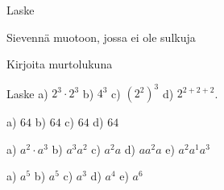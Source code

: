 \begin{tehtavasivu}
\begin{tehtava}
  		Laske
        \begin{vastaus}
        \end{vastaus}
\end{tehtava}

        \begin{tehtava}
    Sievennä muotoon, jossa ei ole sulkuja
        \begin{vastaus}
        \end{vastaus}
    \end{tehtava}

        \begin{tehtava}
  		Kirjoita murtolukuna
       \begin{vastaus}
        \end{vastaus}
    \end{tehtava}

   \begin{tehtava}
        Laske
        a) $2^3\cdot2^3$
        b) $4^3$
        c) $(2^2)^3$
        d) $2^{2+2+2}$.

        \begin{vastaus}
            a) $64$
            b) $64$
            c) $64$
            d) $64$
        \end{vastaus}
    \end{tehtava}
    
    \begin{tehtava}
        a) $a^2\cdot a^3$
        b) $a^3a^2$
        c) $a^2 a$
        d) $a a^2 a$
        e) $a^2a^1a^3$
        
        \begin{vastaus}
            a) $a^5$
            b) $a^5$
            c) $a^3$ 
            d) $a^4$
            e) $a^6$
        \end{vastaus}
    \end{tehtava}


\end{tehtavasivu}
